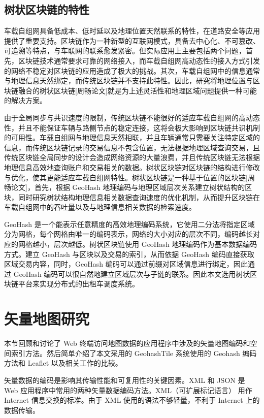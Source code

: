 \subsection{树状区块链的特性}
车载自组网具备低成本、低时延以及地理位置天然联系的特性，在道路安全等应用提供了重要支持。区块链作为一种新型的互联网模式，具备去中心化、不可篡改、可追溯等特点，与车联网的联系愈发紧密。但实际应用上主要包括两个问题，首先，区块链技术通常要求可靠的网络接入，而车载自组网高动态性的接入方式引发的网络不稳定对区块链的应用造成了极大的挑战。其次，车载自组网中的信息通常与地理信息天然绑定，而传统区块链并不支持此特性。因此，研究将地理位置与区块链融合的树状区块链[周畅论文]就是为上述灵活性和地理区域问题提供一种可能的解决方案。\par
由于全局同步与共识速度的限制，传统区块链不能很好的适应车载自组网的高动态性，并且不能保证车辆与路侧节点的稳定连接，这将会极大影响到区块链共识机制的可用性。车载自组网与地理信息天然相联，并且车辆通常只需要关注特定区域的信息，而传统区块链记录的交易信息不包含位置，无法根据地理区域查询交易，且传统区块链全局同步的设计会造成网络资源的大量浪费，并且传统区块链无法根据地理信息高效地查询账户和交易相关的数据。树状区块链对区块链的结构进行修改与优化，使其更能适应车载自组网特性。树状区块链是一种基于位置的区块链[周畅论文]，首先，根据 GeoHash 地理编码与地理区域层次关系建立树状结构的区块，同时研究树状结构地理信息相关数据查询速度的优化机制，从而提升区块链在车载自组网中的吞吐量以及与地理信息相关数据的检索速度。\par
GeoHash 是一个能表示任意精度的高效地理编码系统，它使用二分法将指定区域分为网格，每个网格由唯一的编码表示，网络的大小对应的层次不同，编码越长对应的网格越小，层次越低。树状区块链使用 GeoHash 地理编码作为基本数据编码方式。建立 GeoHash 与区块以及交易的索引，从而依据 GeoHash 编码直接获取区域交易内容，同时，GeoHash 编码可以通过前缀对区域信息进行绑定，因此通过 GeoHash 编码可以很自然地建立区域层次与子链的联系。因此本文选用树状区块链平台来实现分布式的出租车调度系统。
\section{矢量地图研究}
本节回顾和讨论了 Web 终端访问地图数据的应用程序中涉及的矢量地图编码和空间索引方法。然后简单介绍了本文采用的 GeohashTile 系统使用的 Geohash 编码方法和 Leaflet 以及相关工作的比较。\par
矢量数据的编码是影响其传输性能和可复用性的关键因素。XML 和 JSON 是 Web 应用程序中常用的两种矢量数据编码方法。XML（可扩展标记语言） 用作 Internet 信息交换的标准。由于 XML 使用的语法不够轻量，不利于 Internet 上的数据传输。
